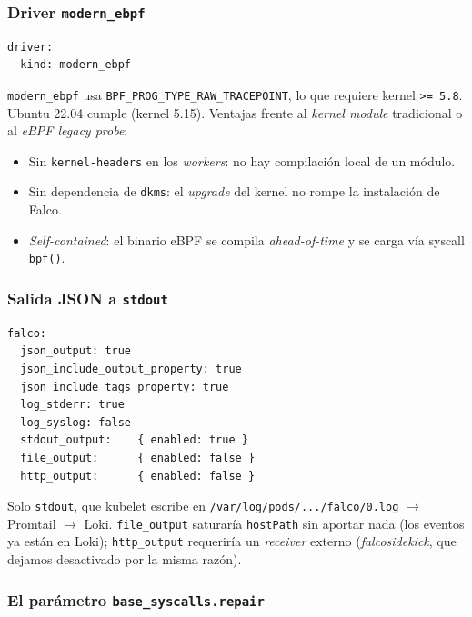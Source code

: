 \subsubsection{Driver \texttt{modern\_ebpf}}

\begin{lstlisting}[style=yaml]
driver:
  kind: modern_ebpf
\end{lstlisting}

\texttt{modern\_ebpf} usa \texttt{BPF\_PROG\_TYPE\_RAW\_TRACEPOINT}, lo que requiere kernel \texttt{\textgreater= 5.8}. Ubuntu 22.04 cumple (kernel 5.15). Ventajas frente al \emph{kernel module} tradicional o al \emph{eBPF legacy probe}:

\begin{itemize}
  \item Sin \texttt{kernel-headers} en los \emph{workers}: no hay compilación local de un módulo.
  \item Sin dependencia de \texttt{dkms}: el \emph{upgrade} del kernel no rompe la instalación de Falco.
  \item \emph{Self-contained}: el binario eBPF se compila \emph{ahead-of-time} y se carga vía syscall \texttt{bpf()}.
\end{itemize}

\subsubsection{Salida JSON a \texttt{stdout}}

\begin{lstlisting}[style=yaml]
falco:
  json_output: true
  json_include_output_property: true
  json_include_tags_property: true
  log_stderr: true
  log_syslog: false
  stdout_output:    { enabled: true }
  file_output:      { enabled: false }
  http_output:      { enabled: false }
\end{lstlisting}

Solo \texttt{stdout}, que kubelet escribe en \texttt{/var/log/pods/.../falco/0.log} $\to$ Promtail $\to$ Loki. \texttt{file\_output} saturaría \texttt{hostPath} sin aportar nada (los eventos ya están en Loki); \texttt{http\_output} requeriría un \emph{receiver} externo (\emph{falcosidekick}, que dejamos desactivado por la misma razón).

\subsubsection{El parámetro \texttt{base\_syscalls.repair}}

